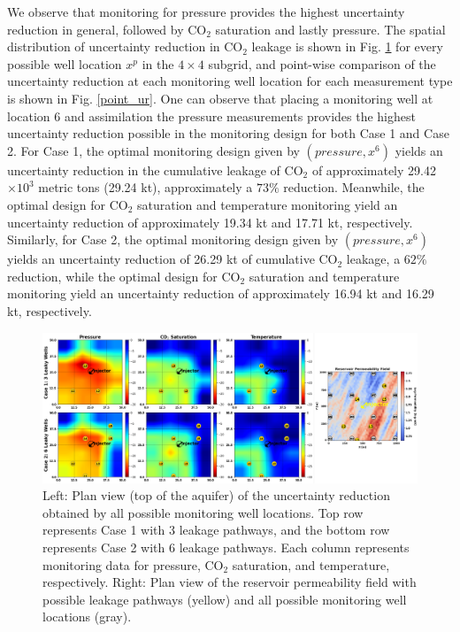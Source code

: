 \documentclass[a4paper,fleqn]{cas-sc}
\begin{document}
We observe that monitoring for pressure provides the highest uncertainty reduction in general, followed by CO$_2$ saturation and lastly pressure. The spatial distribution of uncertainty reduction in CO$_2$ leakage is shown in Fig. \ref{heatmaps} for every possible well location $x^p$ in the $4 \times 4$ subgrid, and point-wise comparison of the uncertainty reduction at each monitoring well location for each measurement type is shown in Fig. \ref{point_ur}. One can observe that placing a monitoring well at location 6 and assimilation the pressure measurements provides the highest uncertainty reduction possible in the monitoring design for both Case 1 and Case 2. For Case 1, the optimal monitoring design given by $(pressure, x^6)$ yields an uncertainty reduction in the cumulative leakage of CO$_2$ of approximately 29.42$\times 10^3$ metric tons (29.24 kt), approximately a $73\%$ reduction. Meanwhile, the optimal design for CO$_2$ saturation and temperature monitoring yield an uncertainty reduction of approximately 19.34 kt and 17.71 kt, respectively. Similarly, for Case 2, the optimal monitoring design given by $(pressure, x^6)$ yields an uncertainty reduction of 26.29 kt of cumulative CO$_2$ leakage, a $62\%$ reduction, while the optimal design for CO$_2$ saturation and temperature monitoring yield an uncertainty reduction of approximately 16.94 kt and 16.29 kt, respectively.

\begin{figure}
    \centering
    \includegraphics[width=16.5cm]{figs/Figure 10.pdf}
    \caption{Left: Plan view (top of the aquifer) of the uncertainty reduction obtained by all possible monitoring well locations. Top row represents Case 1 with 3 leakage pathways, and the bottom row represents Case 2 with 6 leakage pathways. Each column represents monitoring data for pressure, CO$_2$ saturation, and temperature, respectively. Right: Plan view of the reservoir permeability field with possible leakage pathways (yellow) and all possible monitoring well locations (gray).}
    \label{heatmaps}
\end{figure}
\end{document}
